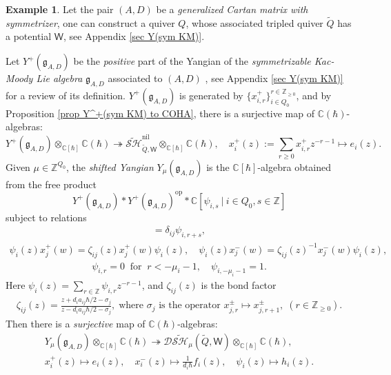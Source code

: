 \documentclass[10pt]{amsart}
\theoremstyle{definition}
\newtheorem{Example}[Theorem]{Example}
\numberwithin{equation}{section}
\newcommand{\bC}{\mathbb{C}}
\newcommand{\bZ}{\mathbb{Z}}
\newcommand{\sW}{\mathsf{W}}
\begin{document}
\begin{Example}\label{ex on gen symi}
Let the pair $(A,D)$ be a \textit{generalized Cartan matrix with symmetrizer}, one can construct a quiver $Q$, whose associated tripled quiver $\widetilde{Q}$ has a potential $\sW$, see Appendix \ref{sec Y(sym KM)}. 


Let $Y^+(\mathfrak{g}_{A,D})$ be the \textit{positive} part of the Yangian of the \textit{symmetrizable Kac-Moody Lie algebra} $\mathfrak{g}_{A,D}$ associated to $(A,D)$ \cite{GTL,YZ3}, 
see Appendix \ref{sec Y(sym KM)} for a review of its definition. $Y^+(\mathfrak{g}_{A,D})$ is generated by $\{x^+_{i,r}\}_{i\in Q_0}^{r\in \bZ_{\geqslant 0}}$, and by Proposition \ref{prop Y^+(sym KM) to COHA}, there is a surjective map of $\bC(\hbar)$-algebras:
$$Y^+(\mathfrak{g}_{A,D})\otimes_{\bC[\hbar]}\bC(\hbar)\twoheadrightarrow \widetilde{\mathcal{SH}}^{\mathrm{nil}}_{\widetilde{Q},\sW}\otimes_{\bC[\hbar]}\bC(\hbar),\quad x^+_i(z):=\sum_{r\geqslant 0}x^+_{i,r}z^{-r-1}\mapsto e_i(z).$$
Given $\mu\in \bZ^{Q_0}$, the \textit{shifted Yangian} $Y_\mu(\mathfrak{g}_{A,D})$ is the $\bC[\hbar]$-algebra obtained from the free product $$Y^+(\mathfrak{g}_{A,D})* Y^+(\mathfrak{g}_{A,D})^{\mathrm{op}}*\bC[\psi_{i,s}\:|\: i\in Q_0,s\in \bZ]$$ subject to relations
\begin{align*}
    [x^+_{i,r},x^-_{j,s}]=\delta_{ij}\psi_{i,r+s},
\end{align*}
\begin{align}\label{relation for shifted yangian of KM alg}
    \psi_i(z)x^+_j(w)=\zeta_{ij}(z)x^+_j(w)\psi_i(z),\quad \psi_i(z)x^-_j(w)=\zeta_{ij}(z)^{-1}x^-_j(w)\psi_i(z),
\end{align}
\begin{align*}
    \psi_{i,r}=0\:\text{ for }\:r<-\mu_i-1,\quad \psi_{i,-\mu_i-1}=1.
\end{align*}
Here $\psi_i(z)=\sum_{r\in\bZ}\psi_{i,r}z^{-r-1}$, and $\zeta_{ij}(z)$ is the bond factor
\begin{align*}
    \zeta_{ij}(z)=\frac{z+d_ia_{ij}\hbar/2-\sigma_j}{z-d_ia_{ij}\hbar/2-\sigma_j},\;\text{where $\sigma_j$ is the operator } x^\pm_{j,r}\mapsto x^\pm_{j,r+1},\;(r\in \bZ_{\geqslant0}).
\end{align*}
Then there is a \textit{surjective} map of $\bC(\hbar)$-algebras:
\begin{gather*}
Y_\mu(\mathfrak{g}_{A,D})\otimes_{\bC[\hbar]}\bC(\hbar)\twoheadrightarrow \mathcal D\widetilde{\mathcal{SH}}_\mu(\widetilde{Q},\sW)\otimes_{\bC[\hbar]}\bC(\hbar),\\
x^+_i(z)\mapsto e_i(z),\quad x^-_i(z)\mapsto \frac{1}{d_i\hbar}f_i(z),\quad \psi_i(z)\mapsto h_i(z).
\end{gather*}
\end{Example}
\end{document}
